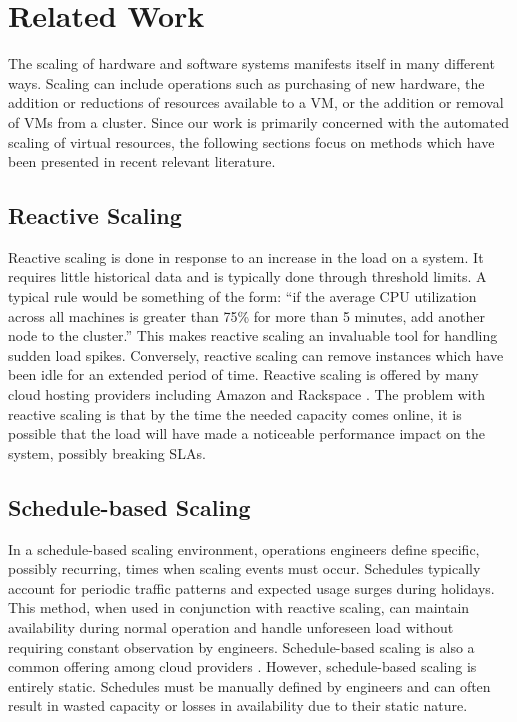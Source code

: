 \chapter{Related Work}
\label{ch:related}
The scaling of hardware and software systems manifests itself in many different ways. Scaling can include operations such as purchasing of new hardware, the addition or reductions of resources available to a VM, or the addition or removal of VMs from a cluster. Since our work is primarily concerned with the automated scaling of virtual resources, the following sections focus on methods which have been presented in recent relevant literature.

\section{Reactive Scaling}
Reactive scaling is done in response to an increase in the load on a system. It requires little historical data and is typically done through threshold limits. A typical rule would be something of the form: ``if the average CPU utilization across all machines is greater than 75\% for more than 5 minutes, add another node to the cluster.'' This makes reactive scaling an invaluable tool for handling sudden load spikes. Conversely, reactive scaling can remove instances which have been idle for an extended period of time. Reactive scaling is offered by many cloud hosting providers including Amazon \cite{ec2autoscale} and Rackspace \cite{rackspace}. The problem with reactive scaling is that by the time the needed capacity comes online, it is possible that the load will have made a noticeable performance impact on the system, possibly breaking SLAs.

\section{Schedule-based Scaling}
In a schedule-based scaling environment, operations engineers define specific, possibly recurring, times when scaling events must occur. Schedules typically account for periodic traffic patterns and expected usage surges during holidays. This method, when used in conjunction with reactive scaling, can maintain availability during normal operation and handle unforeseen load without requiring constant observation by engineers. Schedule-based scaling is also a common offering among cloud providers \cite{ec2autoscale} \cite{rackspace}. However, schedule-based scaling is entirely static. Schedules must be manually defined by engineers and can often result in wasted capacity or losses in availability due to their static nature.

